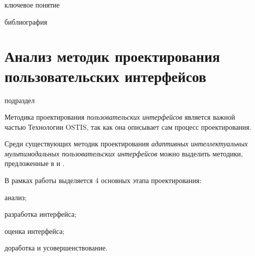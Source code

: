\begin{SCn}
\begin{scnrelfromlist}{ключевое понятие}
\end{scnrelfromlist}
\bigskip

\begin{scnrelfromlist}{библиография}
\end{scnrelfromlist}

\end{SCn}

\section{Анализ методик проектирования пользовательских интерфейсов}
\label{sec_analysis_UI_design_methodologies}

\begin{SCn}
	\begin{scnrelfromlist}{подраздел}
	\end{scnrelfromlist}
\end{SCn}

Методика проектирования \textit{пользовательских интерфейсов} является важной частью Технологии OSTIS, так как она описывает сам процесс проектирования.

Среди существующих методик проектирования \textit{адаптивных интеллектуальных мультимодальных пользовательских интерфейсов} можно выделить методики, предложенные в  и  .

В рамках работы  выделяется 4 основных этапа проектирования:
\begin{textitemize}
    \item анализ;
    \item разработка интерфейса;
    \item оценка интерфейса;
    \item доработка и усовершенствование.
\end{textitemize}

